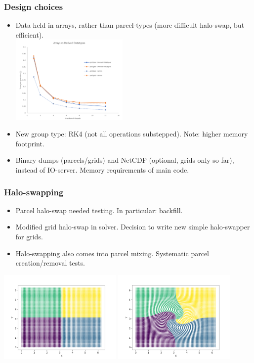 \documentclass{beamer}
\begin{document}
\begin{frame}
\frametitle{Design choices}
\begin{itemize}
\item Data held in arrays, rather than parcel-types (more difficult halo-swap, but efficient). \\
\includegraphics[width=0.45\textwidth]{pmpic_images/grid2par.png} 
\item New group type: RK4 (not all operations substepped). Note: higher memory footprint.
\item Binary dumps (parcels/grids) and NetCDF (optional, grids only so far), instead of IO-server. Memory requirements of main code.
\end{itemize}

\end{frame}

\begin{frame}
\frametitle{Halo-swapping}
\begin{itemize}
\item Parcel halo-swap needed testing. In particular: backfill.
\item Modified grid halo-swap in solver. Decision to write new simple halo-swapper for grids. 
\item Halo-swapping also comes into parcel mixing. Systematic parcel creation/removal tests.
\end{itemize}

\includegraphics[width=0.45\textwidth]{pmpic_images/vel0.png} 
\includegraphics[width=0.45\textwidth]{pmpic_images/vel1.png} 

\end{frame}
\end{document}
